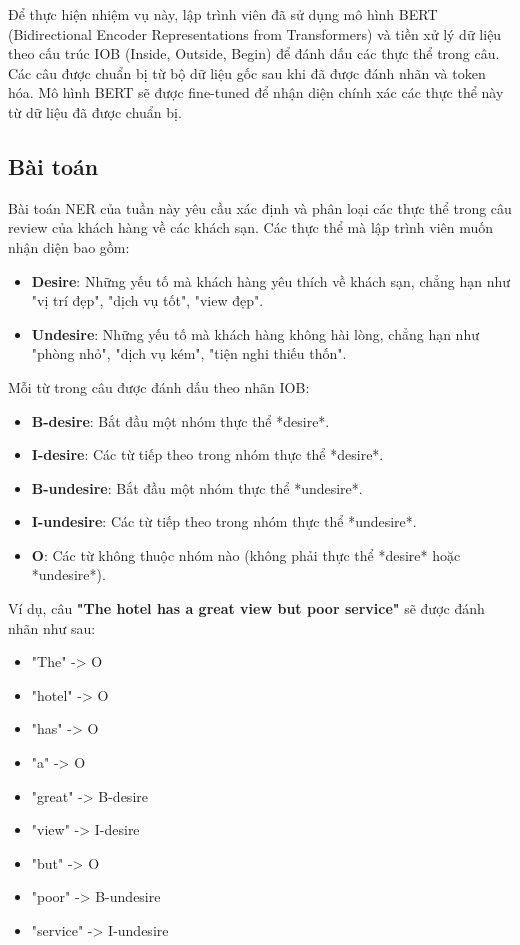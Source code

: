 Để thực hiện nhiệm vụ này, lập trình viên đã sử dụng mô hình BERT (Bidirectional Encoder Representations from Transformers) và tiền xử lý dữ liệu theo cấu trúc IOB (Inside, Outside, Begin) để đánh dấu các thực thể trong câu. Các câu được chuẩn bị từ bộ dữ liệu gốc sau khi đã được đánh nhãn và token hóa. Mô hình BERT sẽ được fine-tuned để nhận diện chính xác các thực thể này từ dữ liệu đã được chuẩn bị.

\subsection{Bài toán}
Bài toán NER của tuần này yêu cầu xác định và phân loại các thực thể trong câu review của khách hàng về các khách sạn. Các thực thể mà lập trình viên muốn nhận diện bao gồm:
\begin{itemize}
    \item \textbf{Desire}: Những yếu tố mà khách hàng yêu thích về khách sạn, chẳng hạn như "vị trí đẹp", "dịch vụ tốt", "view đẹp".
    \item \textbf{Undesire}: Những yếu tố mà khách hàng không hài lòng, chẳng hạn như "phòng nhỏ", "dịch vụ kém", "tiện nghi thiếu thốn".
\end{itemize}

Mỗi từ trong câu được đánh dấu theo nhãn IOB:
\begin{itemize}
    \item \textbf{B-desire}: Bắt đầu một nhóm thực thể *desire*.
    \item \textbf{I-desire}: Các từ tiếp theo trong nhóm thực thể *desire*.
    \item \textbf{B-undesire}: Bắt đầu một nhóm thực thể *undesire*.
    \item \textbf{I-undesire}: Các từ tiếp theo trong nhóm thực thể *undesire*.
    \item \textbf{O}: Các từ không thuộc nhóm nào (không phải thực thể *desire* hoặc *undesire*).
\end{itemize}

Ví dụ, câu \textbf{"The hotel has a great view but poor service"} sẽ được đánh nhãn như sau:
\begin{itemize}
    \item "The" -> O
    \item "hotel" -> O
    \item "has" -> O
    \item "a" -> O
    \item "great" -> B-desire
    \item "view" -> I-desire
    \item "but" -> O
    \item "poor" -> B-undesire
    \item "service" -> I-undesire
\end{itemize}

